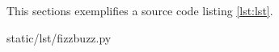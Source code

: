 
This sections exemplifies a source code listing \ref{lst:lst}.

\vspace*{1\baselineskip}


  {static/lst/fizzbuzz.py}
